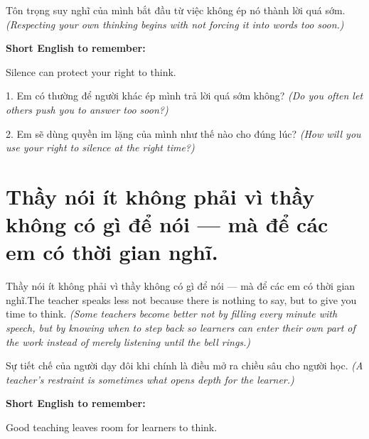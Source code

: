 \begin{baihoc}
Tôn trọng suy nghĩ của mình bắt đầu từ việc không ép nó thành lời quá sớm.
\textit{(Respecting your own thinking begins with not forcing it into words too soon.)}
\end{baihoc}

\begin{ghinhoanh}
\textbf{Short English to remember:}

Silence can protect your right to think.

\end{ghinhoanh}

\begin{tuhocnhanh}
1. Em có thường để người khác ép mình trả lời quá sớm không? \textit{(Do you often let others push you to answer too soon?)}

2. Em sẽ dùng quyền im lặng của mình như thế nào cho đúng lúc? \textit{(How will you use your right to silence at the right time?)}
\end{tuhocnhanh}
\ngancach


\section{Thầy nói ít không phải vì thầy không có gì để nói — mà để các em có thời gian nghĩ.}
\begin{truyen}{Thầy nói ít không phải vì thầy không có gì để nói — mà để các em có thời gian nghĩ.}{The teacher speaks less not because there is nothing to say, but to give you time to think.}
\textit{(Some teachers become better not by filling every minute with speech, but by knowing when to step back so learners can enter their own part of the work instead of merely listening until the bell rings.)}
\end{truyen}

\begin{baihoc}
Sự tiết chế của người dạy đôi khi chính là điều mở ra chiều sâu cho người học.
\textit{(A teacher's restraint is sometimes what opens depth for the learner.)}
\end{baihoc}

\begin{ghinhoanh}
\textbf{Short English to remember:}

Good teaching leaves room for learners to think.

\end{ghinhoanh}

